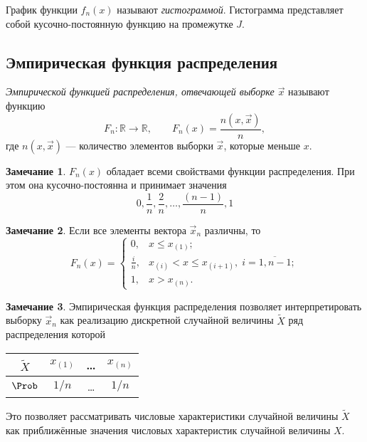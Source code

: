 \documentclass[a4paper, 12pt]{article}
\theoremstyle{definition}
\newtheorem*{rem}{Замечание}
\begin{document}
	График функции $f_n(x)$ называют \emph{гистограммой}. Гистограмма представляет собой кусочно-постоянную функцию на промежутке $J$.

\subsection{Эмпирическая функция распределения}

	\emph{Эмпирической функцией распределения, отвечающей выборке $\vec{x}$} называют функцию
	\begin{equation}
	F_n\colon \mathbb{R} \to \mathbb{R}, \qquad F_n(x) = \frac{n(x, \vec{x})}{n},
	\end{equation} 
	где $n(x, \vec{x})$ --- количество элементов выборки $\vec{x}$, которые меньше $x$.
	
\begin{rem}
    $F_n(x)$ обладает всеми свойствами функции распределения. При этом она кусочно-постоянна и принимает значения 
    \[
        0, \frac{1}{n}, \frac{2}{n}, \ldots, \frac{(n-1)}{n}, 1
    \]
\end{rem}
\begin{rem}
    Если все элементы вектора $\vec{x}_n$ различны, то
    \begin{equation}
        F_n(x) = 
        \begin{cases}
            0, & x \leq x_{(1)}; \\
            \frac{i}{n}, & x_{(i)} < x \leq x_{(i+1)},\; i = \overline{1, n-1}; \\
            1, & x > x_{(n)}.
        \end{cases}
    \end{equation}
\end{rem}
\begin{rem}
    Эмпирическая функция распределения позволяет интерпретировать выборку $\vec{x}_n$ как реализацию дискретной случайной величины $\widetilde{X}$ ряд распределения которой
    \begin{center}
        \renewcommand{\arraystretch}{1.5}
        \begin{tabular}{| c || c | c | c |}
            \hline
            $\widetilde{X}$ & $x_{(1)}$ & \ldots & $x_{(n)}$ \\
            \hline
            $\Prob$ & $1/n$ & \ldots & $1/n$ \\
            \hline
        \end{tabular}
    \end{center}
    Это позволяет рассматривать числовые характеристики случайной величины $\widetilde{X}$ как приближённые значения числовых характеристик случайной величины $X$.
\end{rem}
\end{document}
